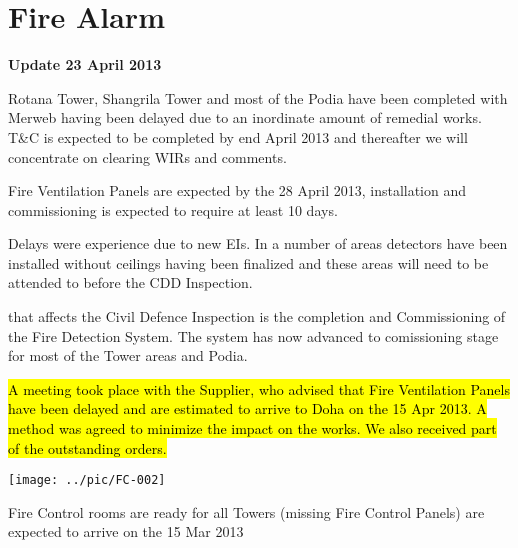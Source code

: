 \chapter {Fire Alarm}
\label{firealarm}

\begin{update}
\centerline{\textbf{Update 23 April 2013}}

\noindent  Rotana Tower, Shangrila Tower and most of the Podia have been completed with Merweb having been delayed due to an inordinate amount of remedial works. T\&C is expected to be completed by end
April 2013 and thereafter we will concentrate on clearing WIRs and comments.

Fire Ventilation Panels are expected by the 28 April 2013, installation and commissioning is expected to require at least 10 days.

Delays were experience due to new EIs. In a number of areas detectors have been installed without ceilings having been finalized and these areas will need to be attended to before the CDD Inspection.

\end{update}

 that affects the Civil Defence Inspection is the completion and Commissioning of the Fire Detection System. The system has now advanced to comissioning stage for most of the Tower areas and Podia.

\hl{A meeting took place with the Supplier, who advised that Fire Ventilation Panels have been delayed and  are estimated to arrive to Doha on the 15 Apr 2013. A method was agreed to minimize the impact on the works. We also received part of the outstanding orders.}

\begin{marginfigure}
\texttt{[image: ../pic/FC-002]}
\caption{Fire Control rooms are ready for all Towers (missing Fire Control Panels) are expected to arrive on the 15 Mar 2013}
\end{marginfigure}



